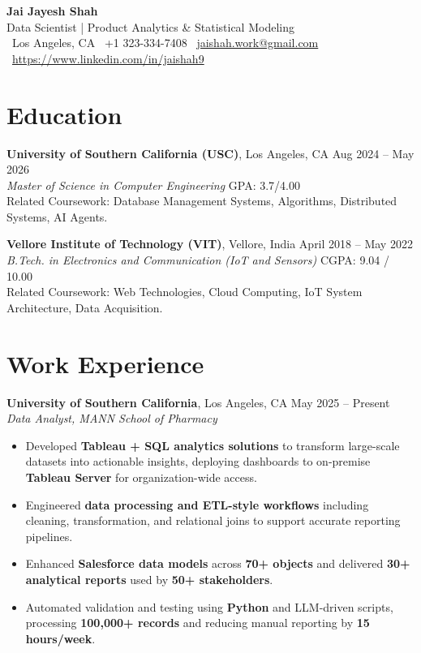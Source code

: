 \documentclass[letterpaper,11pt]{article}
\begin{document}
\begin{center}
    {\LARGE \textbf{Jai Jayesh Shah}}\\
    {\normalsize Data Scientist | Product Analytics \& Statistical Modeling}\\
    \small
    \faMapMarker*\ Los Angeles, CA
    \quad
    \faPhone*\ +1 323-334-7408
    \quad
    \faEnvelope\ \href{mailto:jaishah.work@gmail.com}{jaishah.work@gmail.com}
    \quad
    \faLinkedin\ \href{https://www.linkedin.com/in/jaishah9}{https://www.linkedin.com/in/jaishah9}
\end{center}
\vspace{-13pt}

\section*{Education}
\textbf{University of Southern California (USC)}, Los Angeles, CA \hfill Aug 2024 -- May 2026 \\
\textit{Master of Science in Computer Engineering} \hfill GPA: 3.7/4.00 \\
Related Coursework: Database Management Systems, Algorithms, Distributed Systems, AI Agents.

\textbf{Vellore Institute of Technology (VIT)}, Vellore, India \hfill April 2018 -- May 2022 \\
\textit{B.Tech. in Electronics and Communication (IoT and Sensors)} \hfill CGPA: 9.04 / 10.00 \\
Related Coursework: Web Technologies, Cloud Computing, IoT System Architecture, Data Acquisition.

\section*{Work Experience}
\textbf{University of Southern California}, Los Angeles, CA \hfill May 2025 -- Present \\
\textit{Data Analyst, MANN School of Pharmacy}
\begin{itemize}
    \item Developed \textbf{Tableau + SQL analytics solutions} to transform large-scale datasets into actionable insights, deploying dashboards to on-premise \textbf{Tableau Server} for organization-wide access.
    \item Engineered \textbf{data processing and ETL-style workflows} including cleaning, transformation, and relational joins to support accurate reporting pipelines.
    \item Enhanced \textbf{Salesforce data models} across \textbf{70+ objects} and delivered \textbf{30+ analytical reports} used by \textbf{50+ stakeholders}.
    \item Automated validation and testing using \textbf{Python} and LLM-driven scripts, processing \textbf{100,000+ records} and reducing manual reporting by \textbf{15 hours/week}.
\end{itemize}
\end{document}
